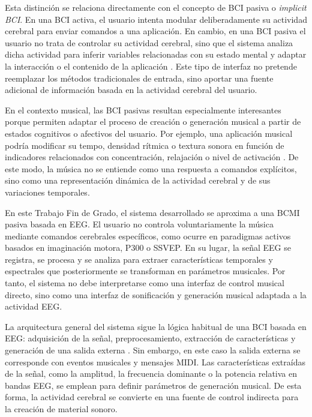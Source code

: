 \documentclass[../main.tex]{subfiles}
\begin{document}
Esta distinción se relaciona directamente con el concepto de BCI pasiva o \textit{implicit BCI}. En una BCI activa, el usuario intenta modular deliberadamente su actividad cerebral para enviar comandos a una aplicación. En cambio, en una BCI pasiva el usuario no trata de controlar su actividad cerebral, sino que el sistema analiza dicha actividad para inferir variables relacionadas con su estado mental y adaptar la interacción o el contenido de la aplicación \cite{GeorgeLecuyer2014PassiveBCI}. Este tipo de interfaz no pretende reemplazar los métodos tradicionales de entrada, sino aportar una fuente adicional de información basada en la actividad cerebral del usuario.

En el contexto musical, las BCI pasivas resultan especialmente interesantes porque permiten adaptar el proceso de creación o generación musical a partir de estados cognitivos o afectivos del usuario. Por ejemplo, una aplicación musical podría modificar su tempo, densidad rítmica o textura sonora en función de indicadores relacionados con concentración, relajación o nivel de activación \cite{GeorgeLecuyer2014PassiveBCI}. De este modo, la música no se entiende como una respuesta a comandos explícitos, sino como una representación dinámica de la actividad cerebral y de sus variaciones temporales.

En este Trabajo Fin de Grado, el sistema desarrollado se aproxima a una BCMI pasiva basada en EEG. El usuario no controla voluntariamente la música mediante comandos cerebrales específicos, como ocurre en paradigmas activos basados en imaginación motora, P300 o SSVEP. En su lugar, la señal EEG se registra, se procesa y se analiza para extraer características temporales y espectrales que posteriormente se transforman en parámetros musicales. Por tanto, el sistema no debe interpretarse como una interfaz de control musical directo, sino como una interfaz de sonificación y generación musical adaptada a la actividad EEG.

La arquitectura general del sistema sigue la lógica habitual de una BCI basada en EEG: adquisición de la señal, preprocesamiento, extracción de características y generación de una salida externa \cite{Palaniappan2014}. Sin embargo, en este caso la salida externa se corresponde con eventos musicales y mensajes MIDI. Las características extraídas de la señal, como la amplitud, la frecuencia dominante o la potencia relativa en bandas EEG, se emplean para definir parámetros de generación musical. De esta forma, la actividad cerebral se convierte en una fuente de control indirecta para la creación de material sonoro.
\end{document}
